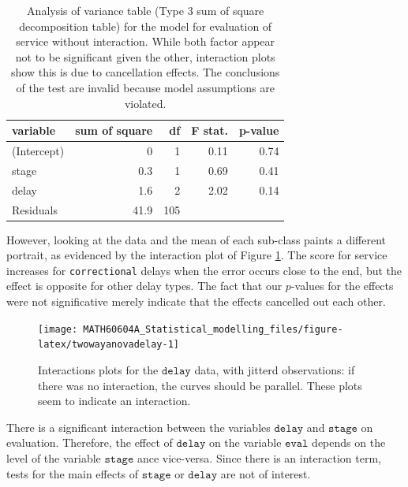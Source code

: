 \documentclass[
  11pt,
  letterpaper,
]{book}
\theoremstyle{definition}
\theoremstyle{definition}
\theoremstyle{definition}
\theoremstyle{remark}
\begin{document}
\begin{table}

\caption{\label{tab:summaryanovadelaynointer}Analysis of variance table (Type 3 sum of square decomposition table) for the model for evaluation of service without interaction. While both factor appear not to be significant given the other, interaction plots show this is due to cancellation effects. The conclusions of the test are invalid because model assumptions are violated.}
\centering
\begin{tabular}[t]{lrrrr}
\toprule
variable & sum of square & df & F stat. & p-value\\
\midrule
(Intercept) & 0 & 1 & 0.11 & 0.74\\
stage & 0.3 & 1 & 0.69 & 0.41\\
delay & 1.6 & 2 & 2.02 & 0.14\\
Residuals & 41.9 & 105 &  & \\
\bottomrule
\end{tabular}
\end{table}

However, looking at the data and the mean of each sub-class paints a different portrait, as evidenced by the interaction plot of Figure \ref{fig:twowayanovadelay}. The score for service increases for \texttt{correctional} delays when the error occurs close to the end, but the effect is opposite for other delay types. The fact that our \(p\)-values for the effects were not significative merely indicate that the effects cancelled out each other.

\begin{figure}

{\centering \texttt{[image: MATH60604A\_Statistical\_modelling\_files/figure-latex/twowayanovadelay-1]} 

}

\caption{Interactions plots for the $\texttt{delay}$ data, with jitterd observations: if there was no interaction, the curves should be parallel. These plots seem to indicate an interaction.}\label{fig:twowayanovadelay}
\end{figure}

There is a significant interaction between the variables \(\texttt{delay}\) and \(\texttt{stage}\) on evaluation. Therefore, the effect of \(\texttt{delay}\) on the variable \(\texttt{eval}\) depends on the level of the variable \(\texttt{stage}\) ance vice-versa. Since there is an interaction term, tests for the main effects of \(\texttt{stage}\) or \(\texttt{delay}\) are not of interest.
\end{document}
